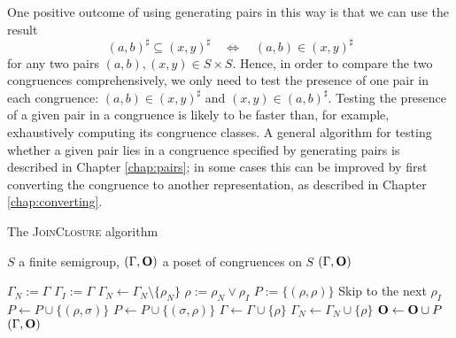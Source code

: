 One positive outcome of using generating pairs in this way is that we can use
the result
$$(a,b)^\sharp \subseteq (x,y)^\sharp \quad\iff\quad (a,b) \in (x,y)^\sharp$$
for any two pairs $(a,b), (x,y) \in S \times S$.  Hence, in order to compare the
two congruences comprehensively, we only need to test the presence of one pair
in each congruence: $(a,b) \in (x,y)^\sharp$ and $(x,y) \in (a,b)^\sharp$.
Testing the presence of a given pair in a congruence is likely to be faster
than, for example, exhaustively computing its congruence classes.  A general
algorithm for testing whether a given pair lies in a congruence specified by
generating pairs is described in Chapter \ref{chap:pairs}; in some cases this
can be improved by first converting the congruence to another representation, as
described in Chapter \ref{chap:converting}.


\begin{algorithm}
  \caption{The \textsc{JoinClosure} algorithm}
  \label{alg:join-closure}
  \begin{algorithmic}[1]
    \Require $S$ a finite semigroup, $(\Gamma,\mathbf{O})$ a poset of congruences on $S$
        \State \Return $(\Gamma, \mathbf{O})$
      \EndIf

      \State $\Gamma_N := \Gamma$ 
      \State $\Gamma_I := \Gamma$ 
          \State $\Gamma_N \gets \Gamma_N \setminus \{\rho_N\}$
            \State $\rho := \rho_N \vee \rho_I$
            \State $P := \{(\rho, \rho)\}$
            \For{$\sigma \in \Gamma$}
              \If{$\rho \subseteq \sigma$}
                \If{$\sigma \subseteq \rho$}
                  \State Skip to the next $\rho_I$
                  \Comment{$\rho = \sigma$}
                \Else
                  \State $P \gets P \cup \{(\rho, \sigma)\}$
                \EndIf
              \ElsIf{$\sigma \subseteq \rho$}
                \State $P \gets P \cup \{(\sigma, \rho)\}$
              \EndIf
            \EndFor
            \State $\Gamma \gets \Gamma \cup \{\rho\}$
            \State $\Gamma_N \gets \Gamma_N \cup \{\rho\}$
            \State $\mathbf{O} \gets \mathbf{O} \cup P$
          \EndFor
        \EndFor
      \EndWhile
      \State \Return $(\Gamma, \mathbf{O})$
    \EndProcedure
  \end{algorithmic}
\end{algorithm}

